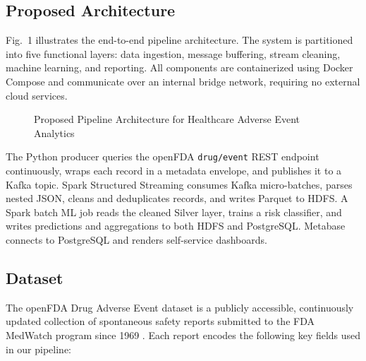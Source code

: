 \documentclass[conference]{IEEEtran}
\begin{document}
\subsection{Proposed Architecture}

Fig.~1 illustrates the end-to-end pipeline architecture. The system is partitioned into five functional layers: data ingestion, message buffering, stream cleaning, machine learning, and reporting. All components are containerized using Docker Compose and communicate over an internal bridge network, requiring no external cloud services.

\begin{figure}[htbp]
\centering
{}
\caption{Proposed Pipeline Architecture for Healthcare Adverse Event Analytics}
\end{figure}

The Python producer queries the openFDA \texttt{drug/event} REST endpoint continuously, wraps each record in a metadata envelope, and publishes it to a Kafka topic. Spark Structured Streaming consumes Kafka micro-batches, parses nested JSON, cleans and deduplicates records, and writes Parquet to HDFS. A Spark batch ML job reads the cleaned Silver layer, trains a risk classifier, and writes predictions and aggregations to both HDFS and PostgreSQL. Metabase connects to PostgreSQL and renders self-service dashboards.

\subsection{Dataset}

The openFDA Drug Adverse Event dataset is a publicly accessible, continuously updated collection of spontaneous safety reports submitted to the FDA MedWatch program since 1969 \cite{openfda}. Each report encodes the following key fields used in our pipeline:
\end{document}

